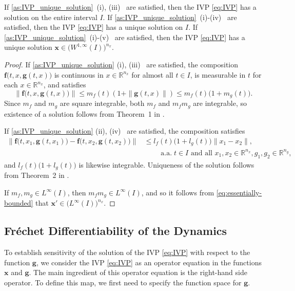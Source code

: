\documentclass[onefignum,onetabnum]{siamart220329}
\numberwithin{equation}{section}
\newcommand{\aall}{\mbox{ a.a.} \;}
\newcommand {\real} {\mathbb{R}}
\newcommand{\bff}{\ensuremath{\mathbf{f}}} %
\newcommand{\bg}{\ensuremath{\mathbf{g}}} %
\newcommand{\bx}{\ensuremath{\mathbf{x}}} %
\newcommand{\WW}{\big( W^{1, \infty}(I) \big)^{n_x}}
\newcommand{\LL}{\big(L^\infty(I) \big)^{n_x}}
\begin{document}
\begin{theorem} \label{th:IVP_unique_solution}
    If \cref{as:IVP_unique_solution}~(i), (iii) \ are satisfied, then 
     the IVP \cref{eq:IVP} has a solution on the entire interval $I$. 
     If \cref{as:IVP_unique_solution}~(i)-(iv) \  are satisfied, then 
     the IVP \cref{eq:IVP} has a unique solution on $I$. 
     If \cref{as:IVP_unique_solution}~(i)-(v) \  are satisfied, then 
     the IVP \cref{eq:IVP} has a unique solution $\bx \in \WW$.
\end{theorem}
\begin{proof} 
     If \cref{as:IVP_unique_solution} (i), (iii) \ are satisfied,
     the composition $\bff\big( t, x, \bg(t, x) \big)$  is continuous in $x \in \real^{n_x}$ for almost all $t \in I$,
     is measurable in $t$ for each $x \in \real^{n_x}$, and satisfies
     \begin{equation} \label{eq:essentially-bounded}
            \big\| \bff\big( t, x, \bg(t, x) \big) \big\| \le m_f(t) (1 + \|  \bg(t, x) \|) \le m_f(t) \big(1 + m_g(t) \big).
     \end{equation}
     Since $m_f$ and $m_g$ are square integrable, both $m_f$ and $m_f m_g$ are integrable, so existence of a solution follows from Theorem~1 in \cite[p.~4]{AFFilippov_1988a}.
  
     If \cref{as:IVP_unique_solution} (ii), (iv) \ are satisfied, the 
     composition satisfies 
     \begin{align*}\big\| \bff\big( t, x_1, \bg(t, x_1) \big) -  \bff\big( t, x_2, \bg(t, x_2) \big)  \big\| &\le l_f(t) \big(1+l_g(t)\big)  \| x_1 - x_2  \|, \\ & \qquad \aall t \in I \mbox{ and all } x_1, x_2 \in \real^{n_x}, g_1, g_2 \in \real^{n_g},
     \end{align*}
     and $l_f(t) \big(1+l_g(t)\big)$ is likewise integrable.
     Uniqueness of the solution follows from Theorem~2 in \cite[p.~5]{AFFilippov_1988a}.
     
     If $m_f, m_g \in L^\infty(I)$, then $m_f m_g \in L^\infty(I)$, and so it follows from  \cref{eq:essentially-bounded}
     that $\bx' \in \LL$. 
\end{proof}


\subsection{Fr\'echet Differentiability of the Dynamics} \label{sec:frechet-differentiability-rhs}
To establish sensitivity of the solution of the IVP \cref{eq:IVP} with respect to the function $\bg$,
we consider the IVP \cref{eq:IVP} as an operator equation in the functions $\bx$ and $\bg$.
The main ingredient of this operator equation is the right-hand side operator. To define this map, we
first need to specify the function space for $\bg$.
\end{document}
